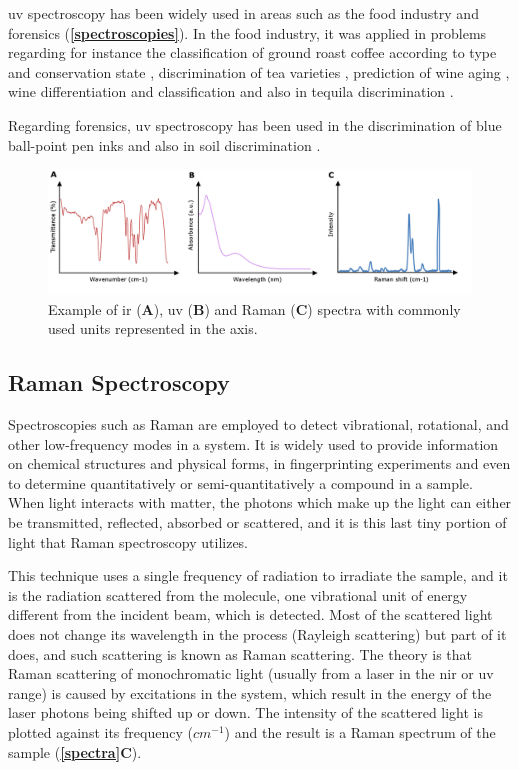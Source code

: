 \gls{uv} spectroscopy has been widely used in areas such as the food industry and forensics (\textbf{\autoref{spectroscopies}}). In the food industry, it was applied in problems regarding for instance the classification of ground roast coffee according to type and conservation state \citep{souto2010uv}, discrimination of tea varieties \citep{kumar2013discrimination}, prediction of wine aging \citep{pereira2011madeira}, wine differentiation and classification \citep{urbano2006ultraviolet} and also in tequila discrimination \citep{barbosa2007uv}.

Regarding forensics, \gls{uv} spectroscopy has been used in the discrimination of blue ball-point pen inks \citep{thanasoulias2003multivariate} and also in soil discrimination \citep{thanasoulias2002application}.

\begin{figure}
	\centering
	\includegraphics[width=1.1\linewidth]{Imagens/spectroscopies}
	\caption{Example of \acrshort{ir} (\textbf{A}), \acrshort{uv} (\textbf{B}) and Raman (\textbf{C}) spectra with commonly used units represented in the axis.}
	\label{spectra}
\end{figure}

\subsection{Raman Spectroscopy}

Spectroscopies such as Raman are employed to detect vibrational, rotational, and other low-frequency modes in a system. It is widely used to provide information on chemical structures and physical forms, in fingerprinting experiments and even to determine quantitatively or semi-quantitatively a compound in a sample. When light interacts with matter, the photons which make up the light can either be transmitted, reflected, absorbed or scattered, and it is this last tiny portion of light that Raman spectroscopy utilizes.

This technique uses a single frequency of radiation to irradiate the sample, and it is the radiation scattered from the molecule, one vibrational unit of energy different from the incident beam, which is detected. Most of the scattered light does not change its wavelength in the process (Rayleigh scattering) but part of it does, and such scattering is known as Raman scattering. The theory is that Raman scattering of monochromatic light (usually from a laser in the \gls{nir} or \gls{uv} range) is caused by excitations in the system, which result in the energy of the laser photons being shifted up or down. The intensity of the scattered light is plotted against its frequency ($ cm^{-1} $) and the result is a Raman spectrum of the sample (\textbf{\autoref{spectra}C}).

